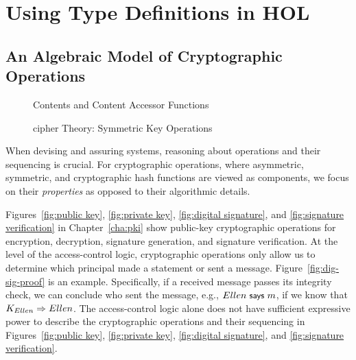 
\chapter{Using Type Definitions in HOL}
\label{chap:types}

\section{An Algebraic Model of Cryptographic Operations}
\label{sec:crypto-ops}



\begin{figure}[t]
  \centering
  \begin{minipage}{1.0\linewidth}
    \HOLcipherDatatypescontents
    \vspace*{-0.1in}
    \HOLcipherDefinitionsgetMessageXXdef
  \end{minipage}
  \caption{Contents and Content Accessor Functions}
  \label{fig:contents}
\end{figure}

\begin{figure}[tb]
  \centering
  \begin{minipage}{1.0\linewidth}
    \HOLcipherDatatypesSymKey
    \HOLcipherDatatypessymMsg
    \vspace*{-0.1in}
    \HOLcipherDefinitionsdeciphSXXdef
  \end{minipage}

  \caption{cipher Theory: Symmetric Key Operations}
  \label{fig:cipher-theory-symmetric}
\end{figure}

When devising and assuring systems, reasoning about operations and
their sequencing is crucial. For cryptographic operations, where
asymmetric, symmetric, and cryptographic hash functions are viewed as
components, we focus on their \emph{properties} as opposed to their
algorithmic details.

Figures~\ref{fig:public key}, \ref{fig:private key}, \ref{fig:digital
  signature}, and \ref{fig:signature verification} in
Chapter~\ref{cha:pki} show public-key cryptographic operations for
encryption, decryption, signature generation, and signature
verification. At the level of the access-control logic, cryptographic
operations only allow us to determine which principal made a statement
or sent a message. Figure~\ref{fig:dig-sig-proof} is an example.
Specifically, if a received message passes its integrity check, we can
conclude who sent the message, e.g., $Ellen \text{\small\textsf{ says }} m$, if we know that
$K_{Ellen} \Rightarrow Ellen$. The access-control logic alone does not
have sufficient expressive power to describe the cryptographic
operations and their sequencing in Figures~\ref{fig:public key},
\ref{fig:private key}, \ref{fig:digital signature}, and
\ref{fig:signature verification}.

